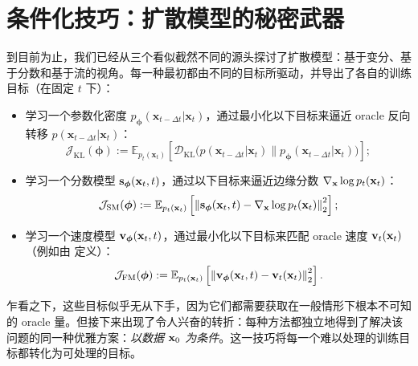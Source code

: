 \section{条件化技巧：扩散模型的秘密武器}\label{sec:conditional-trick}
到目前为止，我们已经从三个看似截然不同的源头探讨了扩散模型：基于变分、基于分数和基于流的视角。每一种最初都由不同的目标所驱动，并导出了各自的训练目标（在固定 $t$ 下）：
\begin{itemize}
    \item {} 学习一个参数化密度 $p_{\bm{\phi}}(\mathbf{x}_{t-\Delta t}|\mathbf{x}_t)$，通过最小化以下目标来逼近 oracle 反向转移 $p(\mathbf{x}_{t-\Delta t}|\mathbf{x}_t)$：
    \[
    \mathcal{J}_{\text{KL}}(\bm{\phi}) := \mathbb{E}_{p_t(\mathbf{x}_t)}\left[
        \mathcal{D}_{\mathrm{KL}}\big(p(\mathbf{x}_{t-\Delta t}|\mathbf{x}_t) \| p_{\bm{\phi}}(\mathbf{x}_{t-\Delta t}|\mathbf{x}_t)\big)
    \right];
    \]
    \item {} 学习一个分数模型 ${\mathbf{s}}_{\bm{\phi}}({\mathbf{x}}_t, t)$，通过以下目标来逼近边缘分数 $\nabla_{{\mathbf{x}}} \log p_t({\mathbf{x}}_t)$：
    \[
    \mathcal{J}_{\text{SM}}(\bm{\phi}) := \mathbb{E}_{p_t({\mathbf{x}}_t)}\left[
       \left\| {\mathbf{s}}_{\bm{\phi}}({\mathbf{x}}_t, t) - \nabla_{{\mathbf{x}}} \log p_t({\mathbf{x}}_t) \right\|_2^2
    \right];
    \]
    \item {} 学习一个速度模型 ${\mathbf{v}}_{\bm{\phi}}({\mathbf{x}}_t, t)$，通过最小化以下目标来匹配 oracle 速度 ${\mathbf{v}}_t({\mathbf{x}}_t)$（例如由  定义）：
    \[
    \mathcal{J}_{\text{FM}}(\bm{\phi}) := \mathbb{E}_{p_t({\mathbf{x}}_t)} \left[
        \left\| {\mathbf{v}}_{\bm{\phi}}({\mathbf{x}}_t, t) - {\mathbf{v}}_t({\mathbf{x}}_t) \right\|_2^2
    \right].
    \]
\end{itemize}

乍看之下，这些目标似乎无从下手，因为它们都需要获取在一般情形下根本不可知的 oracle 量。但接下来出现了令人兴奋的转折：每种方法都独立地得到了解决该问题的同一种优雅方案：\emph{以数据 ${\mathbf{x}}_0$ 为条件}。这一技巧将每一个难以处理的训练目标都转化为可处理的目标。



